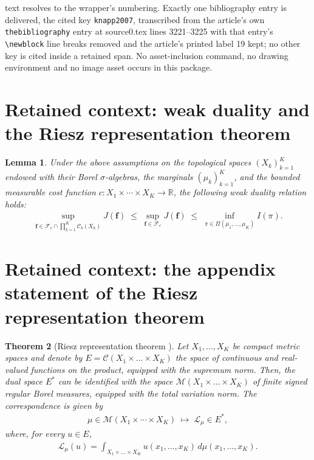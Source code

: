 \documentclass[10pt,a4paper]{amsart}
\theoremstyle{plain}
\newtheorem{theorem}{Theorem}
\newtheorem{lemma}[theorem]{Lemma}
\theoremstyle{definition}
\theoremstyle{remark}
\begin{document}
text resolves to the wrapper's numbering. Exactly one bibliography entry is delivered, the cited key \texttt{knapp2007}, transcribed from the article's own \texttt{thebibliography} entry at source0.tex lines 3221--3225 with that entry's \texttt{\textbackslash newblock} line breaks removed and the article's printed label 19 kept; no other key is cited inside a retained span. No asset-inclusion command, no drawing environment and no image asset occurs in this package.

\section*{Retained context: weak duality and the Riesz representation theorem}

\begin{lemma}\label{easyy}
Under the above assumptions on the topological spaces \((X_k)_{k=1}^K\)
endowed with their Borel \(\sigma\)-algebras, the marginals
\((\mu_k)_{k=1}^K\), and the bounded measurable cost function
\(c:X_1\times\cdots\times X_K\to\mathbb R\), the following weak duality relation holds:
\begin{align*}
\sup_{\boldsymbol f\in\mathcal F_c \cap \prod_{k=1}^K \mathcal C_b(X_k)}
J(\boldsymbol f)
\;\le\;
\sup_{\boldsymbol f\in\mathcal F_c}
J(\boldsymbol f)
\;\le\;
\inf_{\pi\in\Pi(\mu_1,\dots,\mu_K)} I(\pi).
\end{align*}
\end{lemma}


\section*{Retained context: the appendix statement of the Riesz representation theorem}

\begin{theorem}[Riesz representation theorem \cite{knapp2007}]\label{RIEZ}
Let $X_1, \dots, X_K$ be compact metric spaces and denote by $ E=\mathcal{C}(X_1 \times\ldots \times X_K)$ the space of continuous and real-valued functions
on the product, equipped with the supremum norm. 
Then, the dual space $E^*$ can be identified with the space $\mathcal{M}\!(X_1 \times\ldots \times X_K)$ of finite signed regular Borel measures, equipped with the total variation norm. The correspondence is given by
\begin{align*}
\mu \in \mathcal M(X_1 \times \cdots \times X_K)
\;\longmapsto\;
\mathcal{L}_\mu \in E^{*},
\end{align*}
where, for every $u \in E$,
\begin{align*}
\mathcal{L}_\mu(u) 
= \int_{X_1 \times\ldots \times X_K} 
u(x_1, \dots, x_K)\, d\mu(x_1, \dots, x_K).
\end{align*}
\end{theorem}
\end{document}

